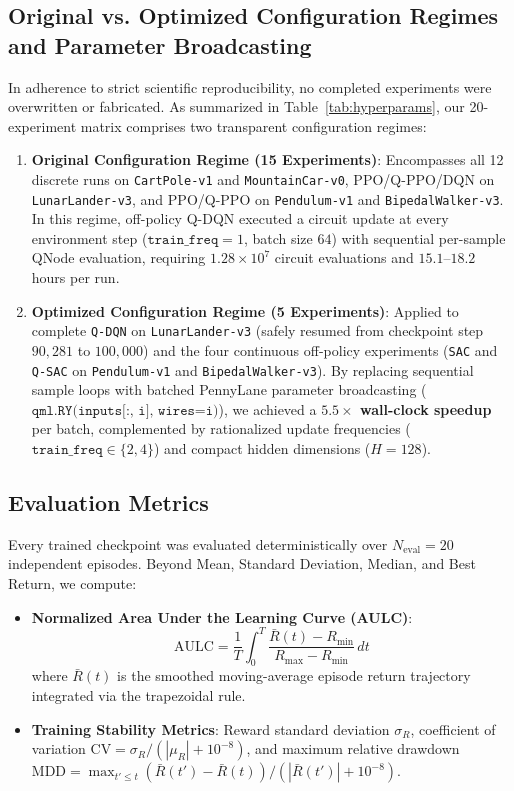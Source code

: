 \documentclass[conference]{IEEEtran}
\begin{document}
\subsection{Original vs. Optimized Configuration Regimes and Parameter Broadcasting}
In adherence to strict scientific reproducibility, no completed experiments were overwritten or fabricated. As summarized in Table~\ref{tab:hyperparams}, our 20-experiment matrix comprises two transparent configuration regimes:
\begin{enumerate}
    \item \textbf{Original Configuration Regime (15 Experiments)}: Encompasses all 12 discrete runs on \texttt{CartPole-v1} and \texttt{MountainCar-v0}, PPO/Q-PPO/DQN on \texttt{LunarLander-v3}, and PPO/Q-PPO on \texttt{Pendulum-v1} and \texttt{BipedalWalker-v3}. In this regime, off-policy Q-DQN executed a circuit update at every environment step ($\texttt{train\_freq}=1$, batch size $64$) with sequential per-sample QNode evaluation, requiring $1.28 \times 10^7$ circuit evaluations and $15.1$--$18.2$ hours per run.
    \item \textbf{Optimized Configuration Regime (5 Experiments)}: Applied to complete \texttt{Q-DQN} on \texttt{LunarLander-v3} (safely resumed from checkpoint step $90,281$ to $100,000$) and the four continuous off-policy experiments (\texttt{SAC} and \texttt{Q-SAC} on \texttt{Pendulum-v1} and \texttt{BipedalWalker-v3}). By replacing sequential sample loops with batched PennyLane parameter broadcasting ($\texttt{qml.RY(inputs[:, i], wires=i)}$), we achieved a \textbf{$5.5\times$ wall-clock speedup} per batch, complemented by rationalized update frequencies ($\texttt{train\_freq} \in \{2, 4\}$) and compact hidden dimensions ($H=128$).
\end{enumerate}

\subsection{Evaluation Metrics}
Every trained checkpoint was evaluated deterministically over $N_{\text{eval}}=20$ independent episodes. Beyond Mean, Standard Deviation, Median, and Best Return, we compute:
\begin{itemize}
    \item \textbf{Normalized Area Under the Learning Curve (AULC)}:
    \begin{equation}
    \text{AULC} = \frac{1}{T} \int_0^T \frac{\bar{R}(t) - R_{\min}}{R_{\max} - R_{\min}}\, dt
    \end{equation}
    where $\bar{R}(t)$ is the smoothed moving-average episode return trajectory integrated via the trapezoidal rule.
    \item \textbf{Training Stability Metrics}: Reward standard deviation $\sigma_R$, coefficient of variation $\text{CV} = \sigma_R / (|\mu_R| + 10^{-8})$, and maximum relative drawdown $\text{MDD} = \max_{t' \le t} (\bar{R}(t') - \bar{R}(t)) / (|\bar{R}(t')| + 10^{-8})$.
\end{itemize}
\end{document}
